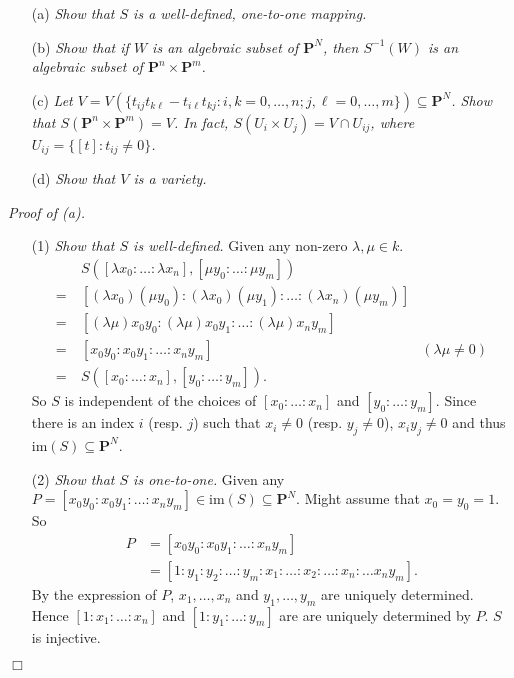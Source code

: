 \documentclass{article}
\begin{document}
\begin{enumerate}
\item[(a)]
  \emph{Show that $S$ is a well-defined, one-to-one mapping.}

\item[(b)]
  \emph{Show that if $W$ is an algebraic subset of $\mathbf{P}^{N}$,
  then $S^{-1}(W)$ is an algebraic subset of $\mathbf{P}^{n} \times \mathbf{P}^{m}$.}

\item[(c)]
  \emph{Let $V = V( \{ t_{ij}t_{k\ell}-t_{i\ell}t_{kj} : i,k = 0,\ldots,n; j,\ell = 0,\ldots,m \})
  \subseteq \mathbf{P}^{N}$. 
  Show that $S(\mathbf{P}^{n} \times \mathbf{P}^{m}) = V$.
  In fact, $S(U_i \times U_j) = V \cap U_{ij}$,
  where $U_{ij} = \{ [t] : t_{ij} \neq 0 \}$.}

\item[(d)]
  \emph{Show that $V$ is a variety.} \\
\end{enumerate}



\emph{Proof of (a).}
\begin{enumerate}
\item[(1)]
  \emph{Show that $S$ is well-defined.}
  Given any non-zero $\lambda, \mu \in k$.
  \begin{align*}
    & \:
    S([\lambda x_0 : \ldots : \lambda x_n], [\mu y_0 : \ldots : \mu y_m]) \\
    = & \:
    [(\lambda x_0)(\mu y_0) : (\lambda x_0)(\mu y_1) : \ldots : (\lambda x_n)(\mu y_m)] \\
    = & \:
    [(\lambda\mu) x_0 y_0 : (\lambda\mu) x_0 y_1 : \ldots : (\lambda\mu) x_n y_m] \\
    = & \:
    [x_0 y_0 : x_0 y_1 : \ldots : x_n y_m]
      &(\lambda\mu \neq 0) \\
    = & \:
    S([x_0 : \ldots : x_n], [y_0 : \ldots : y_m]).
  \end{align*}
  So $S$ is independent of the choices of $[x_0 : \ldots : x_n]$ and $[y_0 : \ldots : y_m]$.
  Since there is an index $i$ (resp. $j$) such that $x_i \neq 0$ (resp. $y_j \neq 0$),
  $x_i y_j \neq 0$ and thus $\mathrm{im}(S) \subseteq \mathbf{P}^{N}$.

\item[(2)]
  \emph{Show that $S$ is one-to-one.}
  Given any $P = [x_0 y_0 : x_0 y_1 : \ldots : x_n y_m] \in \mathrm{im}(S) \subseteq \mathbf{P}^{N}$.
  Might assume that $x_0 = y_0 = 1$. So
  \begin{align*}
    P
    &= [x_0 y_0 : x_0 y_1 : \ldots : x_n y_m] \\
    &= [1 : y_1 : y_2 : \ldots : y_m : x_1 :\ldots : x_2 : \ldots : x_n : \ldots x_n y_m].
  \end{align*}
  By the expression of $P$,
  $x_1, \ldots, x_n$ and $y_1, \ldots, y_m$ are uniquely determined.
  Hence $[1 : x_1 : \ldots : x_n]$ and $[1 : y_1 : \ldots : y_m]$
  are are uniquely determined by $P$.
  $S$ is injective.
\end{enumerate}
$\Box$ \\
\end{document}

